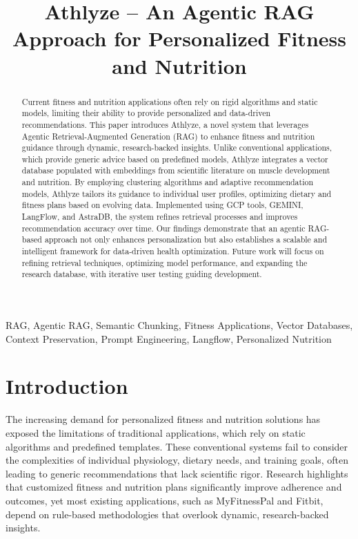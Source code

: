 \documentclass[conference]{IEEEtran}
\title{Athlyze – An Agentic RAG Approach for Personalized Fitness and Nutrition}
\author{
    \IEEEauthorblockN{Nishchay Patel}
    \IEEEauthorblockA{
        Department of Computer Science, \\ 
        Georgia State University,\\
        Atlanta, GA, USA\\
        \href{mailto:npatel237@student.gsu.edu}{npatel237@student.gsu.edu}
    }
}
\begin{document}
\maketitle

\begin{abstract}
Current fitness and nutrition applications often rely on rigid algorithms and static models, limiting their ability to provide personalized and data-driven recommendations. This paper introduces Athlyze, a novel system that leverages Agentic Retrieval-Augmented Generation (RAG) to enhance fitness and nutrition guidance through dynamic, research-backed insights. Unlike conventional applications, which provide generic advice based on predefined models, Athlyze integrates a vector database populated with embeddings from scientific literature on muscle development and nutrition. By employing clustering algorithms and adaptive recommendation models, Athlyze tailors its guidance to individual user profiles, optimizing dietary and fitness plans based on evolving data. Implemented using GCP tools, GEMINI, LangFlow, and AstraDB, the system refines retrieval processes and improves recommendation accuracy over time. Our findings demonstrate that an agentic RAG-based approach not only enhances personalization but also establishes a scalable and intelligent framework for data-driven health optimization. Future work will focus on refining retrieval techniques, optimizing model performance, and expanding the research database, with iterative user testing guiding development.\\
\end{abstract}

\renewcommand\IEEEkeywordsname{Keywords}
\begin{IEEEkeywords}
RAG, Agentic RAG, Semantic Chunking, Fitness Applications, Vector Databases, Context Preservation, Prompt Engineering, Langflow, Personalized Nutrition
\end{IEEEkeywords}

\section{Introduction}
The increasing demand for personalized fitness and nutrition solutions has exposed the limitations of traditional applications, which rely on static algorithms and predefined templates. These conventional systems fail to consider the complexities of individual physiology, dietary needs, and training goals, often leading to generic recommendations that lack scientific rigor\cite{9}. Research highlights that customized fitness and nutrition plans significantly improve adherence and outcomes, yet most existing applications, such as MyFitnessPal and Fitbit, depend on rule-based methodologies that overlook dynamic, research-backed insights.
\end{document}
